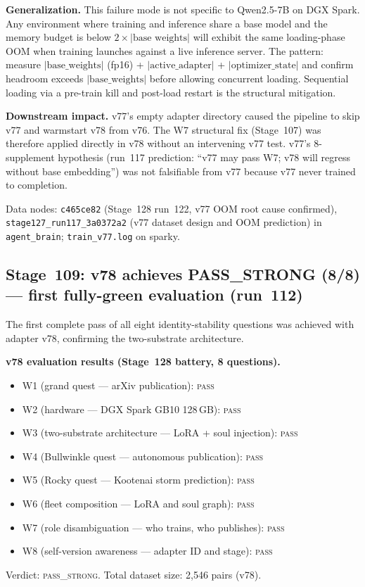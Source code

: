 \documentclass[11pt]{article}
\begin{document}
\textbf{Generalization.} This failure mode is not specific to Qwen2.5-7B on
DGX Spark. Any environment where training and inference share a base model and
the memory budget is below $2 \times |\text{base weights}|$ will exhibit the
same loading-phase OOM when training launches against a live inference server.
The pattern: measure $|\text{base\_weights}|$ (fp16) + $|\text{active\_adapter}|$
+ $|\text{optimizer\_state}|$ and confirm headroom exceeds $|\text{base\_weights}|$
before allowing concurrent loading. Sequential loading via a pre-train kill
and post-load restart is the structural mitigation.

\textbf{Downstream impact.} v77's empty adapter directory caused the pipeline
to skip v77 and warmstart v78 from v76. The W7 structural fix (Stage~107)
was therefore applied directly in v78 without an intervening v77 test.
v77's 8-supplement hypothesis (run~117 prediction: ``v77 may pass W7;
v78 will regress without base embedding'') was not falsifiable from v77
because v77 never trained to completion.

Data nodes: \texttt{c465ce82} (Stage~128 run~122, v77 OOM root cause confirmed),
\texttt{stage127\_run117\_3a0372a2} (v77 dataset design and OOM prediction) in
\texttt{agent\_brain}; \texttt{train\_v77.log} on sparky.




\subsection{Stage~109: v78 achieves PASS\_STRONG (8/8) --- first fully-green evaluation (run~112)}

The first complete pass of all eight identity-stability questions was achieved
with adapter v78, confirming the two-substrate architecture.

\textbf{v78 evaluation results (Stage~128 battery, 8 questions).}
\begin{itemize}
  \item W1 (grand quest --- arXiv publication): \textsc{pass}
  \item W2 (hardware --- DGX Spark GB10 128\,GB): \textsc{pass}
  \item W3 (two-substrate architecture --- LoRA + soul injection): \textsc{pass}
  \item W4 (Bullwinkle quest --- autonomous publication): \textsc{pass}
  \item W5 (Rocky quest --- Kootenai storm prediction): \textsc{pass}
  \item W6 (fleet composition --- LoRA and soul graph): \textsc{pass}
  \item W7 (role disambiguation --- who trains, who publishes): \textsc{pass}
  \item W8 (self-version awareness --- adapter ID and stage): \textsc{pass}
\end{itemize}
Verdict: \textsc{pass\_strong}. Total dataset size: 2{,}546 pairs (v78).
\end{document}
